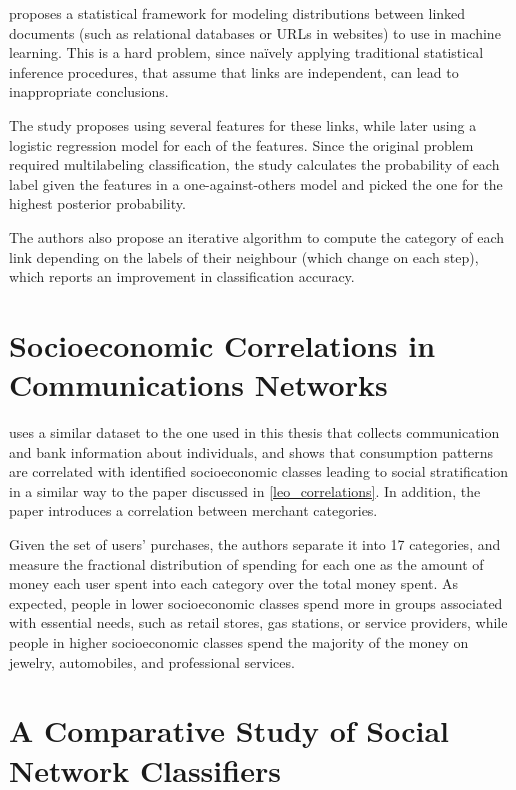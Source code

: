 \cite{lu2003link} proposes a statistical framework for modeling distributions between linked documents (such as relational databases or URLs in websites) to use in machine learning. This is a hard problem, since naïvely applying traditional statistical inference procedures, that assume that links are independent, can lead to inappropriate conclusions\cite{jensen1999statistical}.

The study proposes using several features for these links, while later using a logistic regression model for each of the features. Since the original problem required multilabeling classification, the study calculates the probability of each label given the features in a one-against-others model and picked the one for the highest posterior probability.

The authors also propose an iterative algorithm to compute the category of each link depending on the labels of their neighbour (which change on each step), which reports an improvement in classification accuracy.

\section{Socioeconomic Correlations in Communications Networks}

\cite{leo2015socioeconomic} uses a similar dataset to the one used in this thesis that collects communication and bank information about individuals, and shows that consumption patterns are correlated with identified socioeconomic classes leading to social stratification in a similar way to the paper discussed in \ref{leo_correlations}.
In addition, the paper introduces a correlation between merchant categories.

Given the set of users' purchases, the authors separate it into 17 categories, and measure the fractional distribution of spending for each one as the amount of money each user spent into each category over the total money spent.
As expected, people in lower socioeconomic classes spend more in groups associated with essential needs, such as retail stores, gas stations, or service providers, while people in higher socioeconomic classes spend the majority of the money on jewelry, automobiles, and professional services.

\section{A Comparative Study of Social Network Classifiers}

